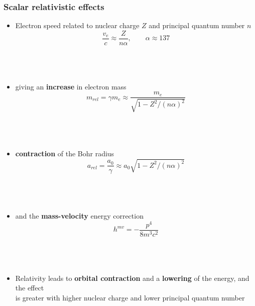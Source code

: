 \documentclass[mathserif,8pt]{beamer}
\begin{document}
\begin{frame}
    \frametitle{Scalar relativistic effects}
    \begin{itemize}
	\item	Electron speed related to nuclear charge $Z$
		and principal quantum number $n$
		\begin{equation}
		    \nonumber
		    \frac{v_e}{c} \approx \frac{Z}{n\alpha},\qquad \alpha \approx 137
		\end{equation}
		\ \\
		\ \\
		\ \\
	\item	giving an \textbf{increase} in electron mass
		\begin{equation}
		    \nonumber
		    m_{rel} = \gamma m_e \approx \frac{m_e}{\sqrt{1-Z^2/(n\alpha)^2}}
		\end{equation}
		\ \\
		\ \\
		\ \\
	\item	\textbf{contraction} of the Bohr radius
		\begin{equation}
		    \nonumber
		    a_{rel} = \frac{a_0}{\gamma} \approx a_0\sqrt{1-Z^2/(n\alpha)^2}
		\end{equation}
		\ \\
		\ \\
		\ \\
	\item	and the \textbf{mass-velocity} energy correction
		\begin{equation}
		    \nonumber
		    h^{mv} = -\frac{p^4}{8m^3c^2}
		\end{equation}
		\ \\
		\ \\
		\ \\
	\item	Relativity leads to \textbf{orbital contraction} and a \textbf{lowering} of the energy, 
		and the effect\\ is greater with higher nuclear charge and lower principal quantum number
    \end{itemize}
\end{frame}
\end{document}
